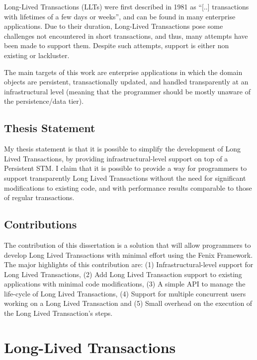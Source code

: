 \documentclass{llncs}
\begin{document}
Long-Lived Transactions (LLTs) were first described in 1981 as ``[..]
transactions with lifetimes of a few days or
weeks''\cite{gray1981transaction}, and can be found in many enterprise
applications. Due to their duration, Long-Lived Transactions pose some
challenges not encountered in short transactions, and thus, many
attempts have been made to support them. Despite such attempts,
support is either non existing or lackluster.

The main targets of this work are enterprise applications in which the
domain objects are persistent, transactionally updated, and handled
transparently at an infrastructural level (meaning that the programmer
should be mostly unaware of the persistence/data tier).

\subsection{Thesis Statement}

My thesis statement is that it is possible to simplify the development
of Long Lived Transactions, by providing infrastructural-level support
on top of a Persistent STM. I claim that it is possible to provide a
way for programmers to support transparently Long Lived Transactions
without the need for significant modifications to existing code, and
with performance results comparable to those of regular transactions.

\subsection{Contributions}

The contribution of this dissertation is a solution that will allow
programmers to develop Long Lived Transactions with minimal effort
using the Fenix Framework. The major highlights of this contribution
are: (1) Infrastructural-level support for Long Lived Transactions,
(2) Add Long Lived Transaction support to existing applications with
minimal code modifications, (3) A simple API to manage the life-cycle
of Long Lived Transactions, (4) Support for multiple concurrent users
working on a Long Lived Transaction and (5) Small overhead on the
execution of the Long Lived Transaction's steps.


\section{Long-Lived Transactions}
\end{document}
